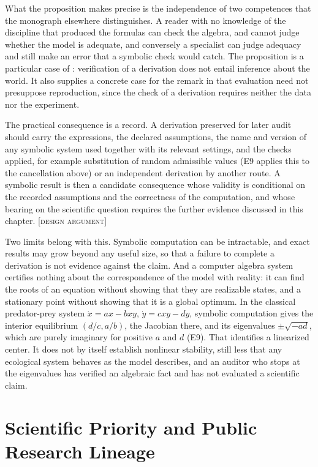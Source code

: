 \documentclass[11pt,twoside,openright]{book}
\theoremstyle{plain}
\theoremstyle{definition}
\theoremstyle{remark}
\newcommand{\Design}{\textup{\textsc{[design argument]}}}
\begin{document}
What the proposition makes precise is the independence of two competences that the monograph elsewhere distinguishes. A reader with no knowledge of the discipline that produced the formulas can check the algebra, and cannot judge whether the model is adequate, and conversely a specialist can judge adequacy and still make an error that a symbolic check would catch. The proposition is a particular case of : verification of a derivation does not entail inference about the world. It also supplies a concrete case for the remark in  that evaluation need not presuppose reproduction, since the check of a derivation requires neither the data nor the experiment.

The practical consequence is a record. A derivation preserved for later audit should carry the expressions, the declared assumptions, the name and version of any symbolic system used together with its relevant settings, and the checks applied, for example substitution of random admissible values (E9 applies this to the cancellation above) or an independent derivation by another route. A symbolic result is then a candidate consequence whose validity is conditional on the recorded assumptions and the correctness of the computation, and whose bearing on the scientific question requires the further evidence discussed in this chapter. \Design{}

Two limits belong with this. Symbolic computation can be intractable, and exact results may grow beyond any useful size, so that a failure to complete a derivation is not evidence against the claim. And a computer algebra system certifies nothing about the correspondence of the model with reality: it can find the roots of an equation without showing that they are realizable states, and a stationary point without showing that it is a global optimum. In the classical predator-prey system $\dot x=ax-bxy$, $\dot y=cxy-dy$, symbolic computation gives the interior equilibrium $(d/c,a/b)$, the Jacobian there, and its eigenvalues $\pm\sqrt{-ad}$, which are purely imaginary for positive $a$ and $d$ (E9). That identifies a linearized center. It does not by itself establish nonlinear stability, still less that any ecological system behaves as the model describes, and an auditor who stops at the eigenvalues has verified an algebraic fact and has not evaluated a scientific claim.

\chapter{Scientific Priority and Public Research Lineage}\label{ch:priority}
\end{document}
